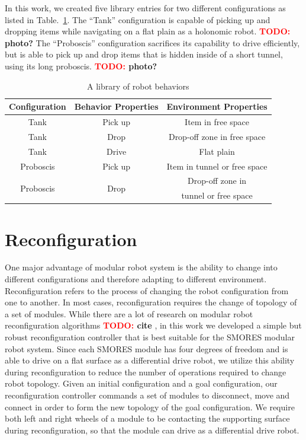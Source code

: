 \documentclass[conference]{IEEEtran}
\newcommand{\TODO}[1]{ {\bf \textcolor{red}{TODO:} #1 }}
\begin{document}
In this work, we created five library entries for two different configurations as listed in Table.~\ref{table:1}. 
The ``Tank'' configuration is capable of picking up and dropping items while navigating on a flat plain as a holonomic robot. \TODO{photo?}
The ``Proboscis'' configuration sacrifices its capability to drive efficiently, but is able to pick up and drop items that is hidden inside of a short tunnel, using its long proboscis. \TODO{photo?}


\begin{table}
\centering
\begin{tabular}{ |c|c|c| } 
 \hline
 Configuration & Behavior Properties & Environment Properties \\
 \hline
 Tank & Pick up & Item in free space\\ 
 Tank & Drop & Drop-off zone in free space\\
 Tank & Drive & Flat plain\\ 
 Proboscis & Pick up & Item in tunnel or free space \\ 
 \multirow{2}{4em}{Proboscis} & \multirow{2}{2em}{Drop} & Drop-off zone in \\
 & & tunnel or free space \\ 
 \hline
\end{tabular}
\caption{A library of robot behaviors}
\label{table:1}
\end{table}
\section{Reconfiguration}
\label{sec:reconfiguration}
%
One major advantage of modular robot system is the ability to change into different configurations and therefore adapting to different environment.
Reconfiguration refers to the process of changing the robot configuration from one to another.
In most cases, reconfiguration requires the change of topology of a set of modules.
While there are a lot of research on modular robot reconfiguration algorithms \TODO{cite}, in this work we developed a simple but robust reconfiguration controller that is best suitable for the SMORES modular robot system.
Since each SMORES module has four degrees of freedom and is able to drive on a flat surface as a differential drive robot, we utilize this ability during reconfiguration to reduce the number of operations required to change robot topology.
Given an initial configuration and a goal configuration, our reconfiguration controller commands a set of modules to disconnect, move and connect in order to form the new topology of the goal configuration.
We require both left and right wheels of a module to be contacting the supporting surface during reconfiguration, so that the module can drive as a differential drive robot.
\end{document}
